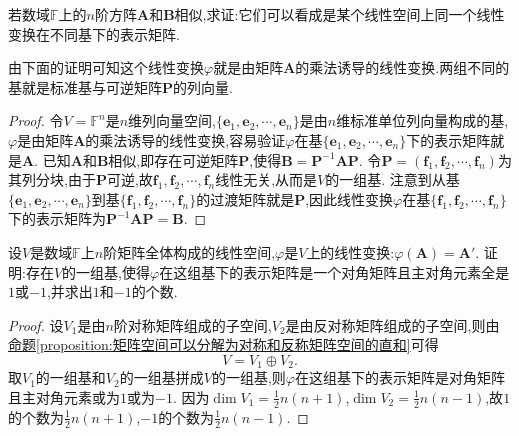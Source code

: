 \documentclass[lang=cn,newtx,10pt,scheme=chinese]{elegantbook}
\begin{document}
\begin{proposition}\label{proposition:相似矩阵可看作一个线性变换在不同基下的表示矩阵}
若数域\(\mathbb{F}\)上的\(n\)阶方阵\(\boldsymbol{A}\)和\(\boldsymbol{B}\)相似,求证:它们可以看成是某个线性空间上同一个线性变换在不同基下的表示矩阵.
\end{proposition}
\begin{note}
由下面的证明可知这个线性变换\(\varphi\)就是由矩阵\(\boldsymbol{A}\)的乘法诱导的线性变换.两组不同的基就是标准基与可逆矩阵\(\boldsymbol{P}\)的列向量.
\end{note}
\begin{proof}
令\(V = \mathbb{F}^n\)是\(n\)维列向量空间,\(\{\boldsymbol{e}_1,\boldsymbol{e}_2,\cdots,\boldsymbol{e}_n\}\)是由\(n\)维标准单位列向量构成的基,\(\varphi\)是由矩阵\(\boldsymbol{A}\)的乘法诱导的线性变换,容易验证\(\varphi\)在基\(\{\boldsymbol{e}_1,\boldsymbol{e}_2,\cdots,\boldsymbol{e}_n\}\)下的表示矩阵就是\(\boldsymbol{A}\). 已知\(\boldsymbol{A}\)和\(\boldsymbol{B}\)相似,即存在可逆矩阵\(\boldsymbol{P}\),使得\(\boldsymbol{B}=\boldsymbol{P}^{-1}\boldsymbol{A}\boldsymbol{P}\).
令\(\boldsymbol{P}=(\boldsymbol{f}_1,\boldsymbol{f}_2,\cdots,\boldsymbol{f}_n)\)为其列分块,由于\(\boldsymbol{P}\)可逆,故\(\boldsymbol{f}_1,\boldsymbol{f}_2,\cdots,\boldsymbol{f}_n\)线性无关,从而是\(V\)的一组基. 注意到从基\(\{\boldsymbol{e}_1,\boldsymbol{e}_2,\cdots,\boldsymbol{e}_n\}\)到基\(\{\boldsymbol{f}_1,\boldsymbol{f}_2,\cdots,\boldsymbol{f}_n\}\)的过渡矩阵就是\(\boldsymbol{P}\),因此线性变换\(\varphi\)在基\(\{\boldsymbol{f}_1,\boldsymbol{f}_2,\cdots,\boldsymbol{f}_n\}\)下的表示矩阵为\(\boldsymbol{P}^{-1}\boldsymbol{A}\boldsymbol{P}=\boldsymbol{B}\). 
\end{proof}

\begin{example}
设\(V\)是数域\(\mathbb{F}\)上\(n\)阶矩阵全体构成的线性空间,\(\varphi\)是\(V\)上的线性变换:\(\varphi(\boldsymbol{A})=\boldsymbol{A}'\). 证明:存在\(V\)的一组基,使得\(\varphi\)在这组基下的表示矩阵是一个对角矩阵且主对角元素全是\(1\)或\(-1\),并求出\(1\)和\(-1\)的个数.
\end{example}
\begin{proof}
设\(V_1\)是由\(n\)阶对称矩阵组成的子空间,\(V_2\)是由反对称矩阵组成的子空间,则由\hyperref[proposition:矩阵空间可以分解为对称和反称矩阵空间的直和]{命题\ref{proposition:矩阵空间可以分解为对称和反称矩阵空间的直和}}可得
\[
V = V_1\oplus V_2.
\]
取\(V_1\)的一组基和\(V_2\)的一组基拼成\(V\)的一组基,则\(\varphi\)在这组基下的表示矩阵是对角矩阵且主对角元素或为\(1\)或为\(-1\). 因为\(\dim V_1=\frac{1}{2}n(n + 1)\),\(\dim V_2=\frac{1}{2}n(n - 1)\),故\(1\)的个数为\(\frac{1}{2}n(n + 1)\),\(-1\)的个数为\(\frac{1}{2}n(n - 1)\).
\end{proof}
\end{document}
